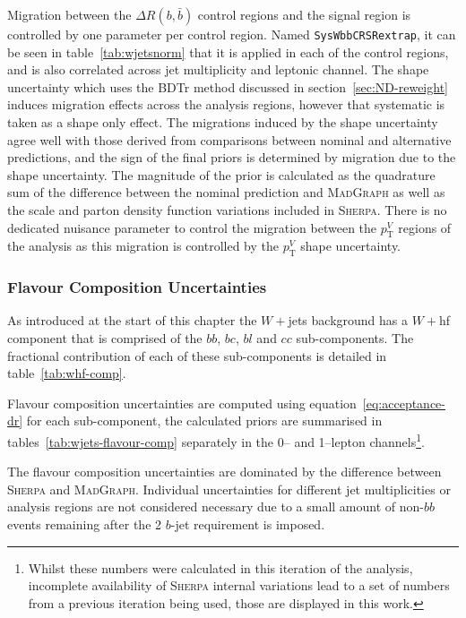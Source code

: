 Migration between the $\Delta R(b, \bar{b})$ control regions and the signal
region is controlled by one parameter per control region. Named
\texttt{SysWbbCRSRextrap}, it can be seen in table~\ref{tab:wjetsnorm} that it
is applied in each of the control regions, and is also correlated across jet
multiplicity and leptonic channel. The shape uncertainty which uses the BDTr
method discussed in section~\ref{sec:ND-reweight} induces migration effects
across the analysis regions, however that systematic is taken as a shape only
effect. The migrations induced by the shape uncertainty agree well with those
derived from comparisons between nominal and alternative predictions, and the
sign of the final priors is determined by migration due to the shape
uncertainty. The magnitude of the prior is calculated as the quadrature sum of
the difference between the nominal prediction and \textsc{MadGraph} as well as
the scale and parton density function variations included in \textsc{Sherpa}.
There is no dedicated nuisance parameter to control the migration between the
$p_{\mathrm{T}}^V$ regions of the analysis as this migration is controlled by
the $p_{\mathrm{T}}^V$ shape uncertainty.

\subsubsection{Flavour Composition Uncertainties}

As introduced at the start of this chapter the $W+$jets background has a $W+$hf
component that is comprised of the $bb$, $bc$, $bl$ and $cc$ sub-components. The
fractional contribution of each of these sub-components is detailed in
table~\ref{tab:whf-comp}.

Flavour composition uncertainties are computed using
equation~\ref{eq:acceptance-dr} for each sub-component, the calculated priors
are summarised in tables~\ref{tab:wjets-flavour-comp} separately in the 0-- and
1--lepton channels\footnote{Whilst these numbers were calculated in this
  iteration of the analysis, incomplete availability of \textsc{Sherpa} internal
  variations lead to a set of numbers from a previous iteration being used,
  those are displayed in this work.}.

The flavour composition uncertainties are dominated by the difference between
\textsc{Sherpa} and \textsc{MadGraph}. Individual uncertainties for different
jet multiplicities or analysis regions are not considered necessary due to a
small amount of non-$bb$ events remaining after the 2 $b$-jet requirement is
imposed.

